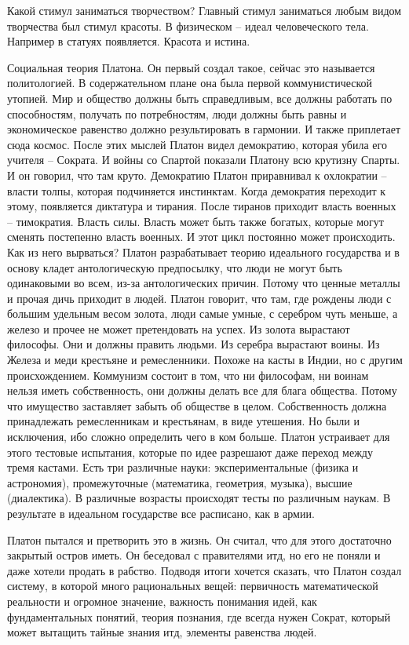 \documentclass[a4paper, 12pt]{article}
\begin{document}
Какой стимул заниматься творчеством? Главный стимул заниматься любым  видом творчества был стимул красоты. В физическом -- идеал человеческого тела. Например в статуях появляется. Красота и истина. 

Социальная теория Платона. Он первый создал такое, сейчас это называется политологией. В содержательном плане она была первой коммунистической утопией. Мир и общество должны быть справедливым, все должны работать по способностям, получать по потребностям, люди должны быть равны и экономическое равенство должно результировать в гармонии. И также приплетает сюда космос. После этих мыслей Платон видел демократию, которая убила его учителя -- Сократа. И войны со Спартой показали Платону всю крутизну Спарты. И он говорил, что там круто. Демократию Платон приравнивал к охлократии -- власти толпы, которая подчиняется инстинктам. Когда демократия переходит к этому, появляется диктатура и тирания. После тиранов приходит власть военных -- тимократия. Власть силы. Власть может быть также богатых, которые могут сменять постепенно власть военных. И этот цикл постоянно может происходить. Как из него вырваться? Платон разрабатывает теорию идеального государства и в основу кладет антологическую предпосылку, что люди не могут быть одинаковыми во всем, из-за антологических причин. Потому что ценные металлы и прочая дичь приходит в людей. Платон говорит, что там, где рождены люди с большим удельным весом золота, люди самые умные, с серебром чуть меньше, а железо и прочее не может претендовать на успех. Из золота вырастают философы. Они и должны править людьми. Из серебра вырастают воины. Из Железа и меди крестьяне и ремесленники. Похоже на касты в Индии, но с другим происхождением. Коммунизм состоит в том, что ни философам, ни воинам нельзя иметь собственность, они должны делать все для блага общества. Потому что имущество заставляет забыть об обществе в целом. Собственность должна принадлежать ремесленникам и крестьянам, в виде утешения. Но были и исключения, ибо сложно определить чего в ком больше. Платон устраивает для этого тестовые испытания, которые по идее разрешают даже переход между тремя кастами. Есть три различные науки: экспериментальные (физика и астрономия), промежуточные (математика, геометрия, музыка), высшие (диалектика). В различные возрасты происходят тесты по различным наукам. В результате в идеальном государстве все расписано, как в армии.

Платон пытался и претворить это в жизнь. Он считал, что для этого достаточно закрытый остров иметь. Он беседовал с правителями итд, но его не поняли и даже хотели продать в рабство. Подводя итоги хочется сказать, что Платон создал систему, в которой много рациональных вещей: первичность математической реальности и огромное значение, важность понимания идей, как фундаментальных понятий, теория познания, где всегда нужен Сократ, который может вытащить тайные знания итд, элементы равенства людей.
\end{document}

